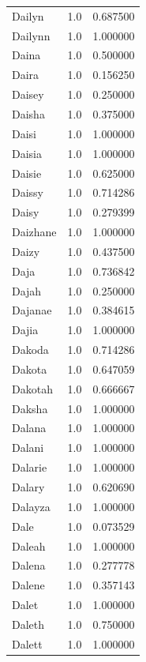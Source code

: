 \documentclass[
  letterpaper,
  DIV=11,
  numbers=noendperiod]{scrreprt}
\begin{document}
\begin{tabular}{lrr}
Dailyn          &   1.0 &   0.687500 \\
Dailynn         &   1.0 &   1.000000 \\
Daina           &   1.0 &   0.500000 \\
Daira           &   1.0 &   0.156250 \\
Daisey          &   1.0 &   0.250000 \\
Daisha          &   1.0 &   0.375000 \\
Daisi           &   1.0 &   1.000000 \\
Daisia          &   1.0 &   1.000000 \\
Daisie          &   1.0 &   0.625000 \\
Daissy          &   1.0 &   0.714286 \\
Daisy           &   1.0 &   0.279399 \\
Daizhane        &   1.0 &   1.000000 \\
Daizy           &   1.0 &   0.437500 \\
Daja            &   1.0 &   0.736842 \\
Dajah           &   1.0 &   0.250000 \\
Dajanae         &   1.0 &   0.384615 \\
Dajia           &   1.0 &   1.000000 \\
Dakoda          &   1.0 &   0.714286 \\
Dakota          &   1.0 &   0.647059 \\
Dakotah         &   1.0 &   0.666667 \\
Daksha          &   1.0 &   1.000000 \\
Dalana          &   1.0 &   1.000000 \\
Dalani          &   1.0 &   1.000000 \\
Dalarie         &   1.0 &   1.000000 \\
Dalary          &   1.0 &   0.620690 \\
Dalayza         &   1.0 &   1.000000 \\
Dale            &   1.0 &   0.073529 \\
Daleah          &   1.0 &   1.000000 \\
Dalena          &   1.0 &   0.277778 \\
Dalene          &   1.0 &   0.357143 \\
Dalet           &   1.0 &   1.000000 \\
Daleth          &   1.0 &   0.750000 \\
Dalett          &   1.0 &   1.000000 \\

\end{tabular}
\end{document}
